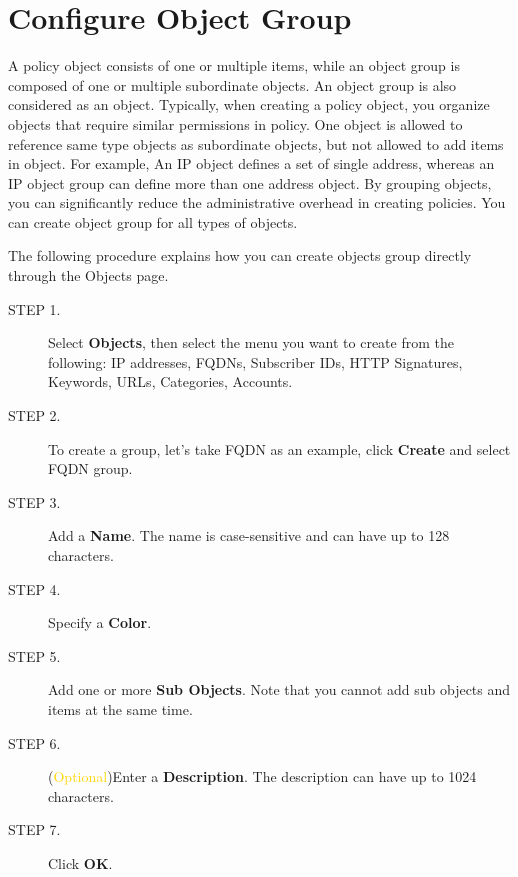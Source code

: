 \section*{\hypertarget{link:Configure Object Group}{Configure Object Group}}
\label{sec:objects:group}

A policy object consists of one or multiple items, while an object group is composed of one or multiple subordinate objects. An object group is also considered as an object. Typically, when creating a policy object, you organize objects that require similar permissions in policy. One object is allowed to reference same type objects as subordinate objects, but not allowed to add items in object. For example, An IP object defines a set of single address, whereas an IP object group can define more than one address object. By grouping objects, you can significantly reduce the administrative overhead in creating policies. You can create object group for all types of objects.


The following procedure explains how you can create objects group directly through the Objects page.

\begin{description}
    \item[STEP 1.]	Select \textbf{Objects}, then select the menu you want to create from the following: IP addresses, FQDNs, Subscriber IDs, HTTP Signatures, Keywords, URLs, Categories, Accounts.
    \item[STEP 2.]	To create a group, let’s take FQDN as an example, click \textbf{Create} and select FQDN group.
    \item[STEP 3.]	Add a \textbf{Name}. The name is case-sensitive and can have up to 128 characters.
    \item[STEP 4.]	Specify a \textbf{Color}.
    \item[STEP 5.]	Add one or more \textbf{Sub Objects}. Note that you cannot add sub objects and items at the same time.
    \item[STEP 6.]	(\textcolor{gold}{Optional})Enter a \textbf{Description}. The description can have up to 1024 characters.
    \item[STEP 7.]	Click \textbf{OK}.    
\end{description}